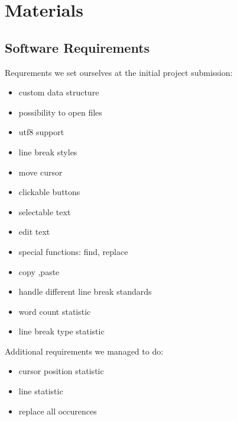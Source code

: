 


\section{Materials}\label{sec:appendixB}
\subsection{Software Requirements}\label{SwReq}
Requrements we set ourselves at the initial project submission:
\begin{itemize}
    \item custom data structure
    \item possibility to open files
    \item utf8 support
    \item line break styles
    \item move cursor
    \item clickable buttons
    \item selectable text
    \item edit text
    \item special functions: find, replace
    \item copy ,paste
    \item handle different line break standards
    \item word count statistic
    \item line break type statistic
\end{itemize}
Additional requirements we managed to do:
\begin{itemize}
    \item cursor position statistic
    \item line statistic 
    \item replace all occurences
\end{itemize}